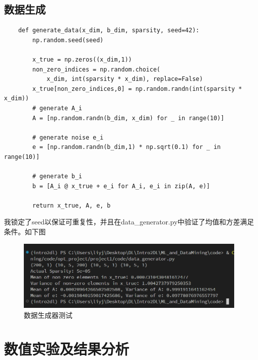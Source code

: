 \documentclass{article}
\begin{document}
\subsection{数据生成}
\begin{lstlisting}
    def generate_data(x_dim, b_dim, sparsity, seed=42):
        np.random.seed(seed)

        x_true = np.zeros((x_dim,1))
        non_zero_indices = np.random.choice(
            x_dim, int(sparsity * x_dim), replace=False)
        x_true[non_zero_indices,0] = np.random.randn(int(sparsity * x_dim))
        # generate A_i
        A = [np.random.randn(b_dim, x_dim) for _ in range(10)]

        # generate noise e_i
        e = [np.random.randn(b_dim,1) * np.sqrt(0.1) for _ in range(10)]

        # generate b_i
        b = [A_i @ x_true + e_i for A_i, e_i in zip(A, e)]

        return x_true, A, e, b
\end{lstlisting}
我锁定了seed以保证可重复性，并且在data\_generator.py中验证了均值和方差满足条件。如下图
\begin{figure}[H]
    \centering
    \includegraphics[width=\linewidth]{./images/Figure_test_0.png}
    \caption{数据生成器测试}
\end{figure}
\newpage
\section{数值实验及结果分析}
\end{document}
